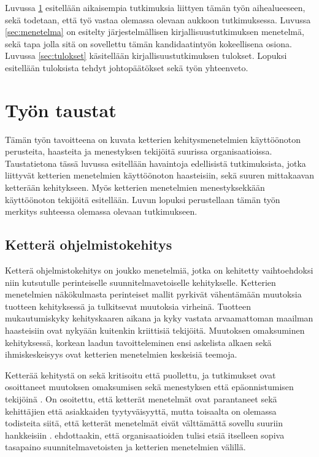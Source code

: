 Luvussa \ref{sec:tausta} esitellään aikaisempia tutkimuksia liittyen tämän työn
aihealueeseen, sekä todetaan, että työ vastaa olemassa olevaan aukkoon
tutkimuksessa. Luvussa \ref{sec:menetelma} on esitelty järjestelmällisen
kirjallisuustutkimuksen menetelmä, sekä tapa jolla sitä on sovellettu tämän
kandidaatintyön kokeellisena osiona. Luvussa \ref{sec:tulokset} käsitellään
kirjallisuustutkimuksen tulokset. Lopuksi esitellään tuloksista tehdyt
johtopäätökset sekä työn yhteenveto.


\clearpage
\section{Työn taustat}
\label{sec:tausta}

Tämän työn tavoitteena on kuvata ketterien kehitysmenetelmien käyttöönoton
perusteita, haasteita ja menestyksen tekijöitä suurissa organisaatioissa.
Taustatietona tässä luvussa esitellään havaintoja edellisistä tutkimuksista,
jotka liittyvät ketterien menetelmien käyttöönoton haasteisiin, sekä suuren
mittakaavan ketterään kehitykseen. Myös ketterien menetelmien menestyksekkään
käyttöönoton tekijöitä esitellään. Luvun lopuksi perustellaan tämän työn
merkitys suhteessa olemassa olevaan tutkimukseen.

\subsection{Ketterä ohjelmistokehitys}

Ketterä ohjelmistokehitys on joukko menetelmiä, jotka on kehitetty vaihtoehdoksi
niin kutsutulle perinteiselle suunnitelmavetoiselle kehitykselle. Ketterien
menetelmien näkökulmasta perinteiset mallit pyrkivät vähentämään muutoksia
tuotteen kehityksessä ja tulkitsevat muutoksia virheinä. Tuotteen
mukautumiskyky kehityskaaren aikana ja kyky vastata arvaamattoman maailman
haasteisiin ovat nykyään kuitenkin kriittisiä tekijöitä. Muutoksen omaksuminen
kehityksessä, korkean laadun tavoitteleminen ensi askelista alkaen sekä
ihmiskeskeisyys ovat ketterien menetelmien keskeisiä teemoja.

Ketterää kehitystä on sekä kritisoitu että puollettu, ja tutkimukset ovat
osoittaneet muutoksen omaksumisen sekä menestyksen että epäonnistumisen
tekijöinä . On osoitettu, että ketterät menetelmät ovat
parantaneet sekä kehittäjien että asiakkaiden tyytyväisyyttä, mutta toisaalta on
olemassa todisteita siitä, että ketterät menetelmät eivät välttämättä sovellu
suuriin hankkeisiin .  ehdottaakin, että
organisaatioiden tulisi etsiä itselleen sopiva tasapaino suunnitelmavetoisten ja
ketterien menetelmien välillä.

